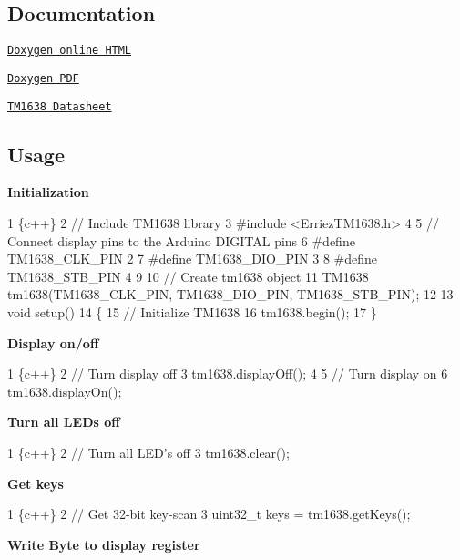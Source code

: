 \subsection*{Documentation}


\begin{DoxyItemize}
\item \href{https://Erriez.github.io/ErriezTM1638}{\tt Doxygen online H\+T\+ML}
\item \href{https://github.com/Erriez/ErriezTM1638/raw/gh-pages/latex/ErriezTM1638.pdf}{\tt Doxygen P\+DF}
\item \href{https://github.com/Erriez/ErriezTM1638/blob/master/extras/TM1638_datasheet.pdf}{\tt T\+M1638 Datasheet}
\end{DoxyItemize}

\subsection*{Usage}

{\bfseries Initialization}


\begin{DoxyCode}
1 \{c++\}
2 // Include TM1638 library
3 #include <ErriezTM1638.h>
4 
5 // Connect display pins to the Arduino DIGITAL pins
6 #define TM1638\_CLK\_PIN   2
7 #define TM1638\_DIO\_PIN   3
8 #define TM1638\_STB\_PIN   4
9 
10 // Create tm1638 object
11 TM1638 tm1638(TM1638\_CLK\_PIN, TM1638\_DIO\_PIN, TM1638\_STB\_PIN);
12 
13 void setup()
14 \{
15     // Initialize TM1638
16     tm1638.begin();
17 \}
\end{DoxyCode}


{\bfseries Display on/off}


\begin{DoxyCode}
1 \{c++\}
2 // Turn display off
3 tm1638.displayOff();
4 
5 // Turn display on
6 tm1638.displayOn();
\end{DoxyCode}


{\bfseries Turn all L\+ED\textquotesingle{}s off}


\begin{DoxyCode}
1 \{c++\}
2 // Turn all LED's off
3 tm1638.clear();
\end{DoxyCode}


{\bfseries Get keys}


\begin{DoxyCode}
1 \{c++\}
2 // Get 32-bit key-scan
3 uint32\_t keys = tm1638.getKeys();
\end{DoxyCode}


{\bfseries Write Byte to display register}


